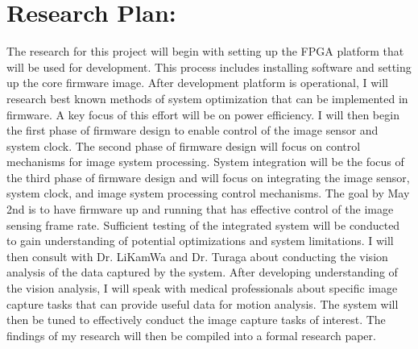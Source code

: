 \section{Research Plan:}

\indent The research for this project will begin with setting up the FPGA platform that will be used for development.
This process includes installing software and setting up the core firmware image. After development platform is
operational, I will research best known methods of system optimization that can be implemented in firmware. A key
focus of this effort will be on power efficiency. I will then begin the first phase of firmware design to enable control
of the image sensor and system clock. The second phase of firmware design will focus on control mechanisms for image system
processing. System integration will be the focus of the third phase of firmware design and will focus on integrating the
image sensor, system clock, and image system processing control mechanisms. The goal by May 2nd is to have firmware up
and running that has effective control of the image sensing frame rate. Sufficient testing of the integrated system will be
conducted to gain understanding of potential optimizations and system limitations. I will then consult with Dr. LiKamWa and Dr.
Turaga about conducting the vision analysis of the data captured by the system. After developing understanding of the vision
analysis, I will speak with medical professionals about specific image capture tasks that can provide useful data for motion
analysis. The system will then be tuned to effectively conduct the image capture tasks of interest. The findings of my research
will then be compiled into a formal research paper.

